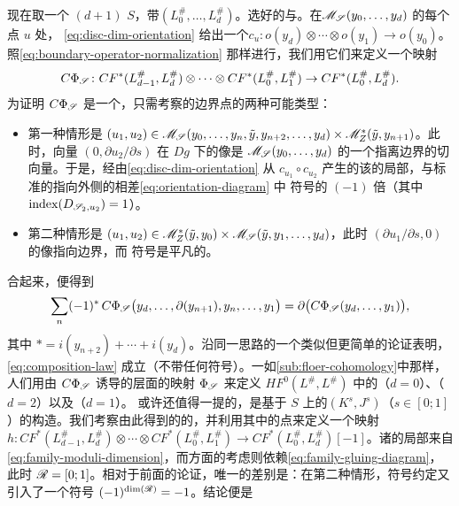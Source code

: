 现在取一个 $(d{+}1)$ \trPointedDisc{}$S$，带\trBrane\trLabel{}$(L_0^{\#},\ldots,L_d^{\#})$。选好\trRegular{}的\trFloerDatum{}与\trPerturbationDatum。在\trModuliSpace{}$\mathscr{M}_{\mathscr{S}}(y_0,\ldots,y_d)$ 的每个\trIsolated{}点 $u$ 处，\trRelative\trOrientation{} \eqref{eq:disc-dim-orientation} 给出一个\trIsomorphism{}$c_u\colon o(y_d)\otimes\cdots\otimes o(y_1)\to o(y_0)$。照\eqref{eq:boundary-operator-normalization} 那样进行，我们用它们来定义一个映射
\begin{equation*}
C\Phi_{\mathscr{S}}\colon CF^*(L_{d-1}^{\#},L_d^{\#})\otimes\cdots\otimes CF^*(L_0^{\#},L_1^{\#})\to CF^*(L_0^{\#},L_d^{\#}).
\end{equation*}
为证明 $C\Phi_{\mathscr{S}}$ 是一个\trChainMap，只需考察\trGromov{}\trCompactification{}的边界点的两种可能类型：
\begin{itemize}
\item 第一种情形是 $(u_1,u_2)\in\mathscr{M}_{\mathscr{S}}(y_0,\ldots,y_n,\tilde{y},y_{n+2},\ldots,y_d)\times\mathscr{M}^*_Z(\tilde{y},y_{n+1})$。此时，\trTranslation{}向量 $(0,\partial u_2/\partial s)$ 在 $Dg$ 下的像是 $\mathscr{M}_{\mathscr{S}}(y_0,\ldots,y_d)$ 的一个指离边界的切向量。于是，经由\eqref{eq:disc-dim-orientation} 从 $c_{u_1}\circ c_{u_2}$ 产生的该\trModuliSpace{}的局部\trOrientation，与标准的指向外侧的\trOrientation{}相差\eqref{eq:orientation-diagram} 中 \trKoszul{}符号的 $(-1)$ 倍（其中 $\mathrm{index}(D_{\mathscr{S}_2,u_2})=1$）。
\item 第二种情形是 $(u_1,u_2)\in\mathscr{M}^*_Z(\tilde{y},y_0)\times\mathscr{M}_{\mathscr{S}}(\tilde{y},y_1,\ldots,y_d)$，此时 $(\partial u_1/\partial s,0)$ 的像指向边界，而 \trKoszul{}符号是平凡的。
\end{itemize}
合起来，便得到
\begin{equation}\label{eq:chain-map-boundary-formula}
\sum_n(-1)^*\,C\Phi_{\mathscr{S}}\bigl(y_d,\ldots,\partial(y_{n+1}),y_n,\ldots,y_1\bigr)
=\partial\bigl(C\Phi_{\mathscr{S}}(y_d,\ldots,y_1)\bigr),
\end{equation}
其中 $*=i(y_{n+2})+\cdots+i(y_d)$。沿同一思路的一个类似但更简单的论证表明，\trCompositionLaw{} \eqref{eq:composition-law} 成立（不带任何符号）。一如\cref{sub:floer-cohomology}中那样，人们用由 $C\Phi_{\mathscr{S}}$ 诱导的\trCohomology{}层面的映射 $\Phi_{\mathscr{S}}$ 来定义 $HF^0(L^{\#},L^{\#})$ 中的\trIdentityMorphism（$d=0$）、\trTriangleProduct（$d=2$）以及\trContinuationMap（$d=1$）。
或许还值得一提的，是基于 $S$ 上\trPerturbationDatum{}的\trFamily{}$(K^s,J^s)$（$s\in[0;1]$）的\trChainHomotopy{}构造。我们考察由此得到的\trParametrization{}的\trModuliSpace，并利用其中的\trIsolated{}点来定义一个映射 $h\colon CF^*(L_{d-1}^{\#},L_d^{\#})\otimes\cdots\otimes CF^*(L_0^{\#},L_1^{\#})\to CF^*(L_0^{\#},L_d^{\#})[-1]$。诸\trModuliSpace{}的局部\trOrientation{}来自\eqref{eq:family-moduli-dimension}，而\trGluing{}方面的考虑则依赖\eqref{eq:family-gluing-diagram}，此时 $\mathscr{R}=[0;1]$。相对于前面的论证，唯一的差别是：在第二种情形，\trKoszul{}符号约定又引入了一个符号 $(-1)^{\dim(\mathscr{R})}=-1$。结论便是
